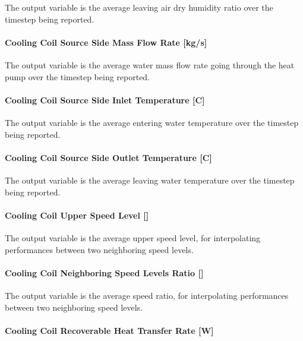 The output variable is the average leaving air dry humidity ratio over the timestep being reported.

\paragraph{Cooling Coil Source Side Mass Flow Rate {[}kg/s{]}}\label{cooling-coil-source-side-mass-flow-rate-kgs-1}

The output variable is the average water mass flow rate going through the heat pump over the timestep being reported.

\paragraph{Cooling Coil Source Side Inlet Temperature {[}C{]}}\label{cooling-coil-source-side-inlet-temperature-c-1}

The output variable is the average entering water temperature over the timestep being reported.

\paragraph{Cooling Coil Source Side Outlet Temperature {[}C{]}}\label{cooling-coil-source-side-outlet-temperature-c-1}

The output variable is the average leaving water temperature over the timestep being reported.

\paragraph{\texorpdfstring{Cooling Coil Upper Speed Level {[]}}{Cooling Coil Upper Speed Level }}\label{cooling-coil-upper-speed-level-1}

The output variable is the average upper speed level, for interpolating performances between two neighboring speed levels.

\paragraph{\texorpdfstring{Cooling Coil Neighboring Speed Levels Ratio {[]}}{Cooling Coil Neighboring Speed Levels Ratio }}\label{cooling-coil-neighboring-speed-levels-ratio-1}

The output variable is the average speed ratio, for interpolating performances between two neighboring speed levels.

\paragraph{Cooling Coil Recoverable Heat Transfer Rate {[}W{]}}\label{cooling-coil-recoverable-heat-transfer-rate-w}

